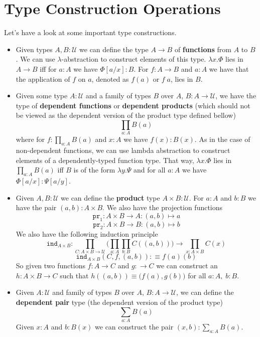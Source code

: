 \documentclass[12pt]{report}
\begin{document}
\section{Type Construction Operations}
Let's have a look at some important type constructions.
\begin{itemize}
	\item Given types $A, B : \mathcal{U}$ we can define the type $A \rightarrow B$ of \textbf{functions} from $A$ to $B$. 
		We can use $\lambda$-abstraction to construct elements of this type. $\lambda x. \Phi$ lies in $A \rightarrow B$ iff for $a : A$ we have $\Phi[a/x] : B$. 
		For $f : A \rightarrow B$ and $a : A$ we have that the application of $f$ on $a$, denoted as $f(a)$ or $f\;a$, lies in $B$.
	\item Given some type $A : \mathcal{U}$ and a family of types $B$ over $A$, $B : A \rightarrow \mathcal{U}$, we have the type of \textbf{dependent functions} or \textbf{dependent products} (which should not be viewed as the dependent version of the product type defined bellow) $$\prod_{a : A} B(a)$$
	where for $f : \prod_{a : A} B(a)$ and $x : A$ we have $f(x) : B(x)$. 
	As in the case of non-dependent functions, we can use lambda abstraction to construct elements of a dependently-typed function type. 
	That way, $\lambda x.\Phi$ lies in $\prod_{a:A}B(a)$ iff $B$ is of the form $\lambda y.\Psi$ and for all $a:A$ we have $\Phi[a/x] : \Psi[a/y]$. 
	\item Given $A, B : \mathcal{U}$ we can define the \textbf{product} type $A \times B : \mathcal{U}$. 
	For $a : A$ and $b : B$ we have the pair $(a,b) : A \times B$. 
	We also have the projection functions 
	$$\mathtt{pr}_1 : A \times B \rightarrow A : (a,b) \mapsto a$$
	$$\mathtt{pr}_2 : A \times B \rightarrow B : (a,b) \mapsto b$$
	We also have the following induction principle
	$$\mathtt{ind}_{A\times B} : \prod_{C: A\times B \rightarrow \mathcal{U}}\big( \prod_{a:A}\prod_{b:B} C((a,b)) \big) \rightarrow \prod_{x: A\times B} C(x)$$
	$$\mathtt{ind}_{A\times B}(C, f, (a,b)) : \equiv f(a)(b)$$
	So given two functions $f: A\rightarrow C$ and $g : \rightarrow C$ we can construct an $h : A\times B \rightarrow C$ such that $h((a,b)) \equiv \big(f(a), g(b)\big)$ for all $a:A,\; b:B$.
	\item Given $A : \mathcal{U}$ and family of types $B$ over $A$, $B : A \rightarrow \mathcal{U}$, we can define the \textbf{dependent pair} type (the dependent version of the product type)
	$$\sum_{a : A} B(a)$$
	Given $x : A$ and $b : B(x)$ we can construct the pair $(x,b) : \sum_{a : A} B(a)$. 

\end{itemize}
\end{document}

